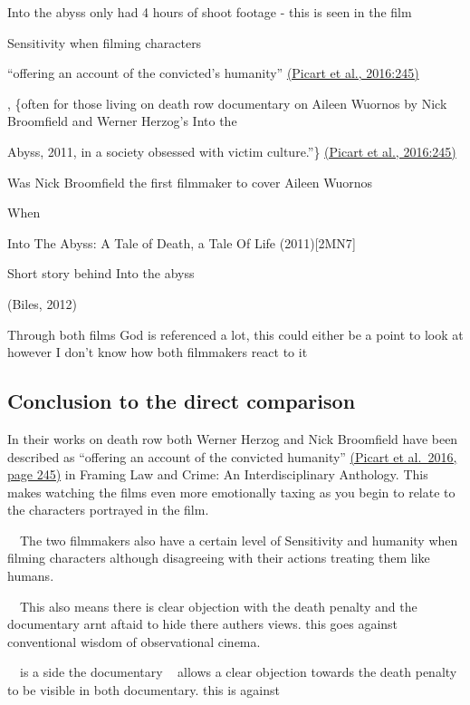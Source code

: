 \documentclass[
]{book}
\begin{document}
Into the abyss only had 4 hours of shoot footage - this is seen in the film~

Sensitivity when filming characters~

``offering an account of the convicted's humanity'' \href{https://paperpile.com/c/SdLVV0/wycg/?locator=245}{(Picart et al., 2016:245)}

, \{often for those living on death row documentary on Aileen Wuornos by Nick Broomfield and Werner Herzog's Into the

Abyss, 2011, in a society obsessed with victim culture.''\} \href{https://paperpile.com/c/SdLVV0/wycg/?locator=245}{(Picart et al., 2016:245)}

Was Nick Broomfield the first filmmaker to cover Aileen Wuornos

When~

Into The Abyss: A Tale of Death, a Tale Of Life (2011){[}2MN7{]}~

Short story behind Into the abyss

(Biles, 2012)

Through both films God is referenced a lot, this could either be a point to look at however I don't know how both filmmakers react to it

\hypertarget{conclusion-to-the-direct-comparison}{%
\subsection{Conclusion to the direct comparison~}\label{conclusion-to-the-direct-comparison}}

In their works on death row both Werner Herzog and Nick Broomfield have been described as ``offering an account of the convicted humanity'' \href{https://paperpile.com/c/SdLVV0/wycg/?locator=245}{(Picart et al.~2016, page 245)} in Framing Law and Crime: An Interdisciplinary Anthology. This makes watching the films even more emotionally taxing as you begin to relate to the characters portrayed in the film.

~~The two filmmakers also have a certain level of Sensitivity and humanity when filming characters although disagreeing with their actions treating them like humans.

~~This also means there is clear objection with the death penalty and the documentary arnt aftaid to hide there authers views. this goes against conventional wisdom of observational cinema.

~~is a side the documentary ~ allows a clear objection towards the death penalty to be visible in both documentary. this is against~
\end{document}
